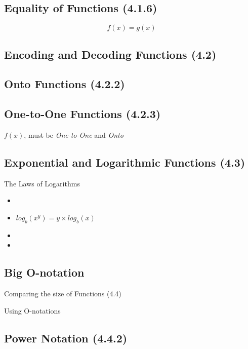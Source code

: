 \documentclass[]{report}
\begin{document}
\begin{enumerate}
\subsection*{Equality of Functions (4.1.6)}
\[f(x) = g(x) \]


\subsection*{Encoding and Decoding Functions (4.2)}


\subsection*{Onto Functions (4.2.2)}

\subsection*{One-to-One Functions (4.2.3)}
$f(x)$, must be \emph{One-to-One} and \emph{Onto}



\subsection*{Exponential and Logarithmic Functions (4.3)}

The Laws of Logarithms
\begin{itemize}
\item
\item $log_b(x^y) = y \times log_b(x)$
\item
\item
\end{itemize}

\subsection*{Big O-notation}
Comparing the size of Functions (4.4)


Using O-notations

\subsection*{Power Notation (4.4.2)}





\end{enumerate}
\end{document}
